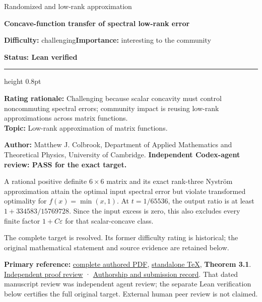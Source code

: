 \documentclass[11pt,a4paper]{article}
\makeatletter
\renewcommand{\subsection}{\Needspace{4\baselineskip}\@startsection{subsection}{2}{0pt}{9pt plus 1pt minus 1pt}{3pt}{\sffamily\bfseries\normalsize\color{ink}}}
\makeatother
\begin{document}
{\sffamily\small\color{muted}Randomized and low-rank approximation\par}
\vspace{3pt}
{\raggedright{}\sffamily\bfseries\fontsize{21}{24}\selectfont\color{ink}Concave-function
transfer of spectral low-rank error\par}
\vspace{7pt}
{\sffamily\small\textbf{Difficulty:} challenging\quad\textbf{Importance:} interesting
to the community\par}
{\sffamily\small\bfseries\color{accent}Status: Lean verified\par}
\vspace{4pt}
{\color{accent}\hrule height 0.8pt}
\vspace{6pt}
\textbf{Rating rationale:} Challenging because scalar concavity must
control noncommuting spectral errors; community impact is reusing
low-rank approximations across matrix functions.\\
\textbf{Topic:} Low-rank approximation of matrix functions.

\subsection{Resolution --- 2026-09-11}\label{resolution-2026-09-11}

\textbf{Author:} Matthew J. Colbrook, Department of Applied Mathematics
and Theoretical Physics, University of Cambridge. \textbf{Independent
Codex-agent review: PASS for the exact target.}

A rational positive definite \(6\times6\) matrix and its exact
rank-three Nyström approximation attain the optimal input spectral error
but violate transformed optimality for \(f(x)=\min(x,1)\). At
\(t=1/65536\), the output ratio is at least \(1+334583/15769728\). Since
the input excess is zero, this also excludes every finite factor
\(1+C\varepsilon\) for that scalar-concave class.

The complete target is resolved. Its former difficulty rating is
historical; the original mathematical statement and source evidence are
retained below.

\textbf{Primary reference:}
\href{https://github.com/ajt60gaibb/OpenProblemsInNLA/blob/main/references/colbrook-transfer-2026-09-11/manuscripts/03_concave_transfer_counterexamples.pdf}{complete
authored PDF},
\href{https://github.com/ajt60gaibb/OpenProblemsInNLA/blob/main/references/colbrook-transfer-2026-09-11/manuscripts/03_concave_transfer_counterexamples.tex}{standalone
TeX}, \textbf{Theorem 3.1}.
\href{https://github.com/ajt60gaibb/OpenProblemsInNLA/blob/main/references/colbrook-transfer-2026-09-11/verification/reviews/RA-08-review.md}{Independent
proof review} ·
\href{https://github.com/ajt60gaibb/OpenProblemsInNLA/blob/main/references/colbrook-transfer-2026-09-11/README.md}{Authorship
and submission record}. That dated manuscript review was independent
agent review; the separate Lean verification below certifies the full
original target. External human peer review is not claimed.
\end{document}
